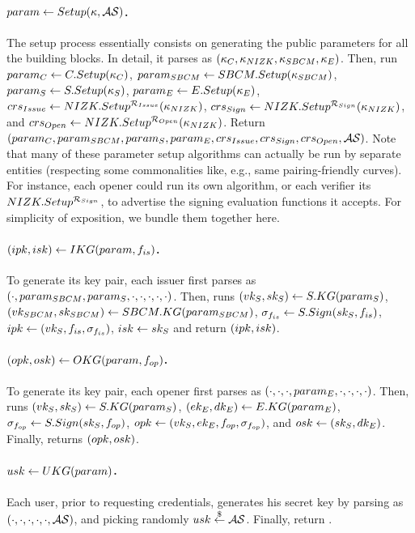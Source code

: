 \paragraph{$param \gets Setup(\kappa,\mathcal{AS})$.} %
The setup process essentially consists on generating the public parameters
for all the building blocks. In detail, it parses \secpar as $(\kappa_{C},
\kappa_{NIZK},\kappa_{SBCM},\kappa_{E})$. Then, run $param_C \gets
C.Setup(\kappa_{C})$, $param_{SBCM} \gets  SBCM.Setup(\kappa_{SBCM})$, $param_{S} \gets
S.Setup(\kappa_{S})$, $param_{E} \gets E.Setup(\kappa_{E})$, $crs_{Issue} \gets
NIZK.Setup^{\mathcal{R}_{Issue}}(\kappa_{NIZK})$, $crs_{Sign} \gets
NIZK.Setup^{\mathcal{R}_{Sign}}(\kappa_{NIZK})$, and $crs_{Open} \gets
NIZK.Setup^{\mathcal{R}_{Open}}(\kappa_{NIZK})$. Return $(param_C,param_{SBCM},
param_{S},param_{E},crs_{Issue},crs_{Sign},crs_{Open},
\mathcal{AS})$. Note that many of these parameter setup algorithms can
actually be run by separate entities (respecting some commonalities like,
e.g., same pairing-friendly curves). For instance, each opener could
run its own \ESetup algorithm, or each verifier its
$NIZK.Setup^{\mathcal{R}_{Sign}}$, to advertise the signing evaluation functions
it accepts. For simplicity of exposition, we bundle them together here.

\paragraph{$(ipk,isk) \gets IKG(param,f_{is})$.} %
To generate its key pair, each issuer first parses \parm as $(\cdot,param_{SBCM},
param_{S},\cdot,\cdot,\cdot,\cdot,\cdot)$. Then, runs $(vk_{S},sk_{S}) \gets
S.KG(param_{S})$, $(vk_{SBCM},sk_{SBCM}) \gets SBCM.KG(param_{SBCM})$,
$\sigma_{f_{is}} \gets S.Sign(sk_{S},f_{is})$, $ipk \gets (vk_{S},f_{is},
\sigma_{f_{is}})$, $isk \gets sk_{S}$ and return $(ipk,isk)$.

\paragraph{$(opk,osk) \gets OKG(param,f_{op})$.} %
To generate its key pair, each opener first parses \parm as $(\cdot,\cdot,
\cdot,param_{E},\cdot,\cdot,\cdot,\cdot)$. Then, runs $(vk_{S},sk_{S}) \gets S.KG
(param_{S})$, $(ek_{E},dk_{E}) \gets E.KG(param_{E})$, $\sigma_{f_{op}} \gets S.Sign
(sk_{S},f_{op})$, $opk \gets (vk_{S},ek_{E},f_{op},\sigma_{f_{op}})$, and $osk \gets
(sk_{S},dk_{E})$. Finally, returns $(opk,osk)$.

\paragraph{$usk \gets UKG(param)$.} %
Each user, prior to requesting credentials, generates his secret key by parsing
\parm as $(\cdot,\cdot,\cdot,\cdot,\cdot,\mathcal{AS})$, and picking randomly
$usk \stackrel{\$}{\gets} \mathcal{AS}$. Finally, return \usk.

